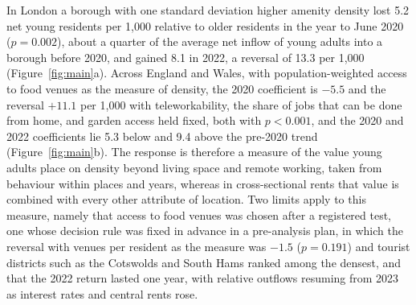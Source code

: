\documentclass[11pt,a4paper]{article}
\begin{document}
In London a borough with one standard deviation higher amenity density lost 5.2 net young residents per 1,000 relative to older residents in the year to June 2020 ($p = 0.002$), about a quarter of the average net inflow of young adults into a borough before 2020, and gained 8.1 in 2022, a reversal of 13.3 per 1,000 (Figure~\ref{fig:main}a). Across England and Wales, with population-weighted access to food venues as the measure of density, the 2020 coefficient is $-5.5$ and the reversal $+11.1$ per 1,000 with teleworkability, the share of jobs that can be done from home, and garden access held fixed, both with $p < 0.001$, and the 2020 and 2022 coefficients lie 5.3 below and 9.4 above the pre-2020 trend (Figure~\ref{fig:main}b). The response is therefore a measure of the value young adults place on density beyond living space and remote working, taken from behaviour within places and years, whereas in cross-sectional rents that value is combined with every other attribute of location. Two limits apply to this measure, namely that access to food venues was chosen after a registered test, one whose decision rule was fixed in advance in a pre-analysis plan, in which the reversal with venues per resident as the measure was $-1.5$ ($p = 0.191$) and tourist districts such as the Cotswolds and South Hams ranked among the densest, and that the 2022 return lasted one year, with relative outflows resuming from 2023 as interest rates and central rents rose.
\end{document}
